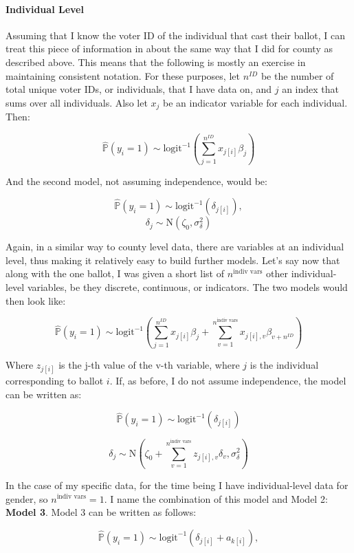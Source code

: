 \documentclass[]{article}
\let\oldparagraph\paragraph
\renewcommand{\paragraph}[1]{\oldparagraph{#1}\mbox{}}
\begin{document}
\paragraph{Individual Level}\label{individual-level}

Assuming that I know the voter ID of the individual that cast their
ballot, I can treat this piece of information in about the same way that
I did for county as described above. This means that the following is
mostly an exercise in maintaining consistent notation. For these
purposes, let \(n^{ID}\) be the number of total unique voter IDs, or
individuals, that I have data on, and \(j\) an index that sums over all
individuals. Also let \(x_{j}\) be an indicator variable for each
individual. Then:

\[\hat{\mathbb{P}}(y_i = 1) \sim \text{logit}^{-1}(\sum_{j = 1}^{n^{ID}}x_{j[i]}\beta_{j})\]

And the second model, not assuming independence, would be:

\[\hat{\mathbb{P}}(y_i = 1) \sim \text{logit}^{-1}(\delta_{j[i]}), \]
\[\delta_{j} \sim \text{N}(\zeta_0, \sigma_{\delta}^2)\]

Again, in a similar way to county level data, there are variables at an
individual level, thus making it relatively easy to build further
models. Let's say now that along with the one ballot, I was given a
short list of \(n^{\text{indiv vars}}\) other individual-level
variables, be they discrete, continuous, or indicators. The two models
would then look like:

\[\hat{\mathbb{P}}(y_i = 1) \sim \text{logit}^{-1}(\sum_{j = 1}^{n^{ID}}x_{j[i]}\beta_{j} + \sum_{v=1}^{n^{\text{indiv vars}}}x_{j[i], v}\beta_{v+n^{ID}})\]

Where \(z_{j[i]}\) is the j-th value of the v-th variable, where \(j\)
is the individual corresponding to ballot \(i\). If, as before, I do not
assume independence, the model can be written as:

\[\hat{\mathbb{P}}(y_i = 1) \sim \text{logit}^{-1}(\delta_{j[i]})\]

\[\delta_{j} \sim \text{N}(\zeta_0 + \sum_{v=1}^{n^{\text{indiv vars}}}z_{j[i], v}\delta_{v}, \sigma_{\delta}^2)\]

In the case of my specific data, for the time being I have
individual-level data for gender, so \(n^{\text{indiv vars}} = 1\). I
name the combination of this model and Model 2: \textbf{Model 3}. Model
3 can be written as follows:

\begin{equation} \tag{Model 3}
\hat{\mathbb{P}}(y_i = 1) \sim \text{logit}^{-1}(\delta_{j[i]} + a_{k[i]}), 
\end{equation}
\end{document}
